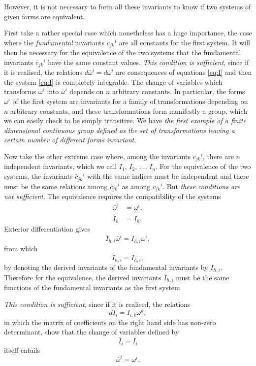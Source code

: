 \documentclass[leqno,11pt]{article}
\theoremstyle{shape1}
\theoremstyle{shape0}
\theoremstyle{shape2}
\theoremstyle{definition}
\begin{document}
However, it is not necessary to form all these invariants to know if two systems of given forms are equivalent.

First take a rather special case which nonetheless has a huge importance, the case where the \emph{fundamental} invariants $c_{jk}{}^{i}$ are all constants for the first system. It will then be necessary for the equivalence of the two systems that the fundamental invariants $\bar c_{jk}{}^{i}$ have the same constant values. \emph{This condition is sufficient}, since if it is realised, the relations $d\bar\omega^{i}=d\omega^{i}$ are consequences of equations \eqref{eq:I} and then the system \eqref{eq:I} is completely integrable. The change of variables which transforms $\omega{^i}$ into $\bar\omega^{i}$ depends on $n$ arbitrary constants. In particular, the forms $\omega^{i}$ of the first system are invariants for a family of transformations depending on $n$ arbitrary constants, and these transformations form manifestly a group, which we can easily check to be simply transitive. We have \emph{the first example of a finite dimensional continuous group defined as the set of transformations leaving a certain number of different forms invariant}.

Now take the other extreme case where, among the invariants $c_{jk}{}^{i}$, there are $n$ independent invariants, which we call $I_{1}$, $I_{2}$, $\dots$, $I_{n}$. For the equivalence of the two systems, the invariants $\bar c_{jk}{}^{i}$ with the same indices must be independent and there must be the same relations among $\bar c_{jk}{}^{i}$ as among $c_{jk}{}^{i}$. But \emph{these conditions are not sufficient}. The equivalence requires the compatibility of the systems
\begin{align*}
  \bar\omega^{i}&=\omega^{i},\\
  \bar I_{h}&=I_{h}.
\end{align*}
Exterior differentiation gives
\[
\bar I_{h,i}\bar\omega^{i}=I_{h,i}\omega^{i},
\]
from which
\[
\bar I_{h,i}=I_{h,i},
\]
by denoting the derived invariants of the fundamental invariants by $I_{h,i}$. Therefore for the equivalence, the derived invariants $\bar I_{h,i}$ must be the same functions of the fundamental invariants as the first system.

\emph{This condition is sufficient}, since if it is realised, the relations
\begin{equation}
  \label{eq:IV}\tag{IV}
  dI_{i}=I_{i,k}\omega^{k},
\end{equation}
in which the matrix of coefficients on the right hand side has non-zero determinant, show that the change of variables defined by
\[
\bar I_{i}=I_{i}
\]
itself entails
\[
\bar\omega^{i}=\omega^{i}.
\]
\end{document}

